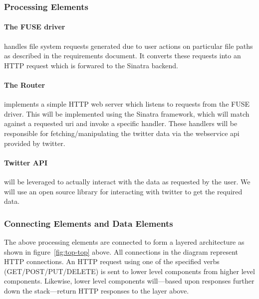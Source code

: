 \subsubsection{Processing Elements}

\paragraph{The FUSE driver} handles file system requests generated due
to user actions on particular file paths as described in the requirements
document. It converts these requests into an HTTP request which is forwared to
the Sinatra backend.

\paragraph{The Router} implements a simple HTTP web server which listens to requests from
the FUSE driver. This will be implemented using the Sinatra framework, which
will match against a requested uri and invoke a specific handler. These handlers
will be responsible for fetching/manipulating the twitter data via the
webservice api provided by twitter.

\paragraph{Twitter API} will be leveraged to actually interact with the data as
requested by the user.  We will use an open source library for interacting with
twitter to get the required data.

\subsubsection{Connecting Elements and Data Elements}

The above processing elements are connected to form a layered architecture as
shown in figure~\ref{fig:top-top} above. All connections in the diagram
represent HTTP connections. An HTTP request using one of the specified verbs
(GET/POST/PUT/DELETE) is sent to lower level components from higher level
components. Likewise, lower level components will---based upon responses further
down the stack---return HTTP responses to the layer above.


